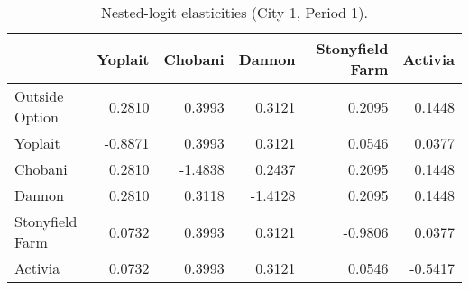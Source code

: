 \begin{table}[H]
\centering
\caption{Nested-logit elasticities (City 1, Period 1).}
\label{tab:q21_elast}
\begin{tabular}{lrrrrr}
\toprule
 & Yoplait & Chobani & Dannon & Stonyfield Farm & Activia \\
\midrule
Outside Option & 0.2810 & 0.3993 & 0.3121 & 0.2095 & 0.1448 \\
Yoplait & -0.8871 & 0.3993 & 0.3121 & 0.0546 & 0.0377 \\
Chobani & 0.2810 & -1.4838 & 0.2437 & 0.2095 & 0.1448 \\
Dannon & 0.2810 & 0.3118 & -1.4128 & 0.2095 & 0.1448 \\
Stonyfield Farm & 0.0732 & 0.3993 & 0.3121 & -0.9806 & 0.0377 \\
Activia & 0.0732 & 0.3993 & 0.3121 & 0.0546 & -0.5417 \\
\bottomrule
\end{tabular}
\end{table}
